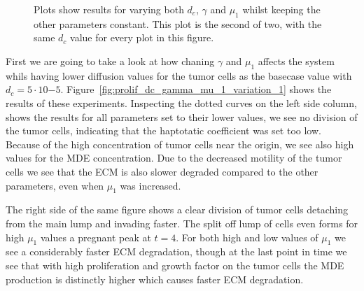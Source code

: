 \begin{figure}[h!]
    \centering
    \caption{Plots show results for varying both $d_c$, $\gamma$ and $\mu_1$ whilst keeping the other parameters constant. This plot is the second of two, with the same $d_c$ value for every plot in this figure.}
    \label{fig:prolif_dc_gamma_mu_1_variation_2}
\end{figure}

First we are going to take a look at how chaning $\gamma$ and $\mu_1$ affects the system whils having lower diffusion values for the tumor cells as the basecase value with $d_c=5\cdot 10{-5}$. Figure~\ref{fig:prolif_dc_gamma_mu_1_variation_1} shows the results of these experiments. Inspecting the dotted curves on the left side column, shows the results for all parameters set to their lower values, we see no division of the tumor cells, indicating that the haptotatic coefficient was set too low. Because of the high concentration of tumor cells near the origin, we see also high values for the MDE concentration. Due to the decreased motility of the tumor cells we see that the ECM is also slower degraded compared to the other parameters, even when $\mu_1$ was increased. 

The right side of the same figure shows a clear division of tumor cells detaching from the main lump and invading faster. The split off lump of cells even forms for high $\mu_1$ values a pregnant peak at $t=4$. For both high and low values of $\mu_1$ we see a considerably faster ECM degradation, though at the last point in time we see that with high proliferation and growth factor on the tumor cells the MDE production is distinctly higher which causes faster ECM degradation.

